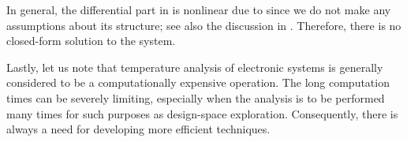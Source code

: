 In general, the differential part in  is
nonlinear due to \vp since we do not make any assumptions about its structure;
see also the discussion in . Therefore, there is no
closed-form solution to the system.

Lastly, let us note that temperature analysis of electronic systems is generally
considered to be a computationally expensive operation. The long computation
times can be severely limiting, especially when the analysis is to be performed
many times for such purposes as design-space exploration. Consequently, there is
always a need for developing more efficient techniques.
